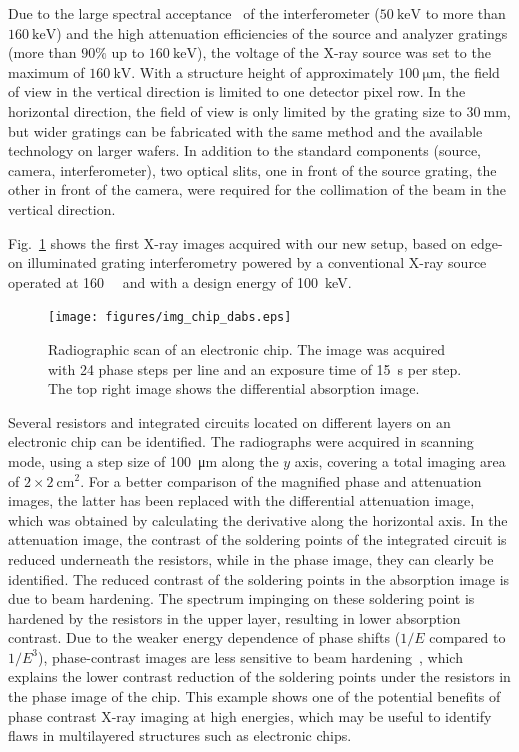 \documentclass[english]{nature}
\begin{document}
Due to the large spectral acceptance~\cite{Weitkamp2005,Thuering2013c} of the
interferometer ($\SI{50}{\kilo\electronvolt}$ to
more than $\SI{160}{\kilo\electronvolt}$) and the high attenuation efficiencies of
the source and analyzer gratings (more than $90\%$ up to
$\SI{160}{\kilo\electronvolt}$), the voltage of the X-ray source was set to
the maximum of $\SI{160}{\kilo\volt}$. With a structure height of
approximately $\SI{100}{\micro \metre}$, the field of view in the vertical
direction is limited to one detector pixel row. In the horizontal direction,
the field of view is only limited by the grating size to
$\SI{30}{\milli\metre}$, but wider gratings can be fabricated with the same
method and the available technology on larger wafers. In addition to the standard components (source,
camera, interferometer), two optical slits, one in front of the source
grating, the other in front of the camera, were required for the collimation
of the beam in the vertical direction. 

Fig.~\ref{Fig:img_chip} shows the first X-ray images acquired with our new setup, based on
edge-on illuminated grating interferometry powered by a conventional X-ray
source operated at \SI{160}{\kilo\voltpeak} and with a design energy of
\SI{100}{\kilo\eV}.  
\begin{figure}[h!]
    \centering
    \texttt{[image: figures/img\_chip\_dabs.eps]}
    \caption{Radiographic scan of an electronic chip. The image was acquired
        with 24 phase steps per line and an exposure time of \SI{15}{\second} per
    step. The top right image shows the differential absorption image.}\label{Fig:img_chip}
\end{figure}
Several resistors and integrated circuits located on different
layers on an electronic chip can be identified. The radiographs were acquired in scanning
mode, using a step size of \SI{100}{\micro\metre} along the $y$ axis, covering a total imaging
area of $2 \times \SI{2}{\centi\metre^2}$. For a better comparison of the magnified phase and
attenuation images, the latter has been replaced with the differential
attenuation image, which was obtained by calculating the derivative along
the horizontal axis. In the attenuation image, the contrast of the soldering
points of the integrated circuit is reduced underneath the resistors, while
in the phase image, they can clearly be identified. The reduced contrast of
the soldering points in the absorption image is due to beam hardening. The
spectrum impinging on these soldering point is hardened by the resistors in
the upper layer, resulting in lower absorption contrast. Due to the weaker
energy dependence of phase shifts ($1/E$ compared to $1/E^3$), phase-contrast
images are less sensitive to beam hardening~\cite{Chabior2011a}, which explains the lower
contrast reduction of the soldering points under the resistors in the
phase image of the chip. This example shows one of the potential benefits of
phase contrast X-ray imaging at high energies, which may be useful to
identify flaws in multilayered structures such as electronic chips.
\end{document}
